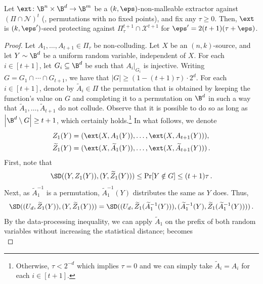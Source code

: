 \documentclass{toc}
\begin{document}
\begin{lemma}\label{lem:nm-to-sp}
Let $\ext \colon \B^{n} \times \B^{d} \rightarrow \B^{m}$ be a $(k,\eps)$-non-malleable extractor
against $\left( \Pi \cap \mathcal{N} \right)^t$ (\ie, permutations with no fixed points), and fix any $\tau \ge 0$. Then, $\ext$ is $(k,\eps')$-seed protecting against $\Pi^{t+1}_{\tau}  \cap \mathcal{X}^{t+1}$ for
$\eps' = 2(t+1)(\tau+\eps)$.
\end{lemma}
\begin{proof}
Let $A_1,\ldots,A_{t+1} \in \Pi_{\tau}$ be non-colluding. Let $X$ be an $(n,k)$-source, and let $Y \sim \B^{d}$ be 
a uniform random variable, independent of $X$. 
For each $i \in [t+1]$, let $G_i \subseteq \B^{d}$ be such that $A_{i}|_{G_i}$ is injective.
Writing $G = G_{1} \cap \cdots \cap G_{t+1}$, we have that $|G| \ge (1-(t+1)\tau) \cdot 2^{d}$.
%
For each $i \in [t+1]$, denote by $\widetilde{A}_{i} \in \Pi$ the permutation that is obtained by
keeping the function's value on $G$ and completing it to a permutation on $\B^d$ in such a way
that $\widetilde{A}_1,\ldots,\widetilde{A}_{t+1}$ do not collude. Observe that it is possible to do so as long as
$\left|\B^{d} \setminus G\right| \ge t+1$, which certainly holds.\footnote{Otherwise,
$\tau < 2^{-d}$ which implies $\tau = 0$ and we can simply take $\widetilde{A}_i = A_i$
for each $i \in [t+1]$.} 
%
In what follows, we denote
\begin{align*}
Z_1(Y) &= ( \ext(X,A_{1}(Y)),\ldots,\ext(X,A_{t+1}(Y)) ),\\
\widetilde{Z}_1(Y) &= ( \ext(X,\widetilde{A}_{1}(Y)),\ldots,\ext(X,\widetilde{A}_{t+1}(Y)) )\,.
\end{align*}
First, note that
\begin{equation}\label{eq:sec41}
\SD((Y,Z_1(Y)),(Y,\widetilde{Z}_1(Y))) \le \Pr[Y \notin G] \le (t+1)\tau\,.
\end{equation}
Next, as $\widetilde{A}_{1}^{-1}$ is a permutation, $\widetilde{A}_{1}^{-1}(Y)$  distributes the same as $Y$ does. Thus,
\begin{equation}\label{eq:sec42}
\SD((U_d,\widetilde{Z}_1(Y)),(Y,\widetilde{Z}_1(Y))) = 
\SD((U_d,\widetilde{Z}_1(\widetilde{A}_{1}^{-1}(Y))),(\widetilde{A}_{1}^{-1}(Y),\widetilde{Z}_1(\widetilde{A}_{1}^{-1}(Y))))\,.
\end{equation}
By the data-processing inequality,
we can apply $\widetilde{A}_1$ on the prefix of both random variables without increasing
the statistical distance;  becomes
\begin{equation}\label{eq:sec423}

\end{equation}
\end{proof}
\end{document}
